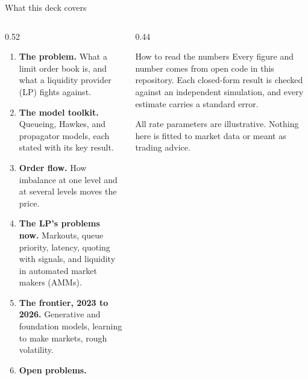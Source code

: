 \begin{frame}{What this deck covers}
  \begin{columns}[T]
    \begin{column}{0.52\textwidth}
      \small
      \begin{enumerate}
        \setlength{\itemsep}{1pt}
        \item \textbf{The problem.} What a limit order book is, and what a liquidity provider (LP) fights against.
        \item \textbf{The model toolkit.} Queueing, Hawkes, and propagator models, each stated with its key result.
        \item \textbf{Order flow.} How imbalance at one level and at several levels moves the price.
        \item \textbf{The LP's problems now.} Markouts, queue priority, latency, quoting with signals, and liquidity in automated market makers (AMMs).
        \item \textbf{The frontier, 2023 to 2026.} Generative and foundation models, learning to make markets, rough volatility.
        \item \textbf{Open problems.}
      \end{enumerate}
    \end{column}
    \begin{column}{0.44\textwidth}
      \begin{alertblock}{How to read the numbers}
        Every figure and number comes from open code in this repository. Each closed-form result is checked against an independent simulation, and every estimate carries a standard error.
      \end{alertblock}
      \vspace{0.4em}
      {\small All rate parameters are illustrative. Nothing here is fitted to market data or meant as trading advice.}
    \end{column}
  \end{columns}
\end{frame}
